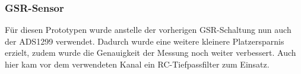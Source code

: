 \subsubsection{GSR-Sensor} \label{gsr-subsubsec}

Für diesen Prototypen wurde anstelle der vorherigen GSR-Schaltung nun auch der ADS1299 verwendet.  Dadurch wurde eine weitere kleinere Platzersparnis erzielt, zudem wurde die Genauigkeit der Messung noch weiter verbessert. Auch hier kam vor dem verwendeten Kanal ein RC-Tiefpassfilter zum Einsatz.


